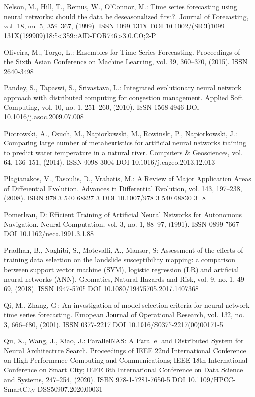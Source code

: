 \begin{thebibliography}{99.}
 Nelson, M., Hill, T., Remus, W., O'Connor, M.: Time series forecasting using neural networks: should the data be deseasonalized first?. Journal of Forecasting, vol. 18, no. 5, 359--367, (1999). ISSN 1099-131X DOI 10.1002/(SICI)1099-131X(199909)18:5<359::AID-FOR746>3.0.CO;2-P

 Oliveira, M., Torgo, L.: Ensembles for Time Series Forecasting. Proceedings of the Sixth Asian Conference on Machine Learning, vol. 39, 360--370, (2015). ISSN 2640-3498

 Pandey, S., Tapaswi, S., Srivastava, L.: Integrated evolutionary neural network approach with distributed computing for congestion management. Applied Soft Computing, vol. 10, no. 1, 251--260, (2010). ISSN 1568-4946 DOI 10.1016/j.asoc.2009.07.008

 Piotrowski, A., Osuch, M., Napiorkowski, M., Rowinski, P., Napiorkowski, J.: Comparing large number of metaheuristics for artificial neural networks training to predict water temperature in a natural river. Computers \& Geosciences, vol. 64, 136--151, (2014). ISSN 0098-3004 DOI 10.1016/j.cageo.2013.12.013

 Plagianakos, V., Tasoulis, D., Vrahatis, M.: A Review of Major Application Areas of Differential Evolution. Advances in Differential Evolution, vol. 143, 197--238, (2008). ISBN 978-3-540-68827-3 DOI 10.1007/978-3-540-68830-3\_8

 Pomerleau, D: Efficient Training of Artificial Neural Networks for Autonomous Navigation. Neural Computation, vol. 3, no. 1, 88--97, (1991). ISSN 0899-7667 DOI 10.1162/neco.1991.3.1.88

 Pradhan, B., Naghibi, S., Motevalli, A., Mansor, S: Assessment of the effects of training data selection on the landslide susceptibility mapping: a comparison between support vector machine (SVM), logistic regression (LR) and artificial neural networks (ANN). Geomatics, Natural Hazards and Risk, vol. 9, no. 1, 49--69, (2018). ISSN 1947-5705 DOI 10.1080/19475705.2017.1407368

 Qi, M., Zhang, G.: An investigation of model selection criteria for neural network time series forecasting. European Journal of Operational Research, vol. 132, no. 3, 666--680, (2001). ISSN 0377-2217 DOI 10.1016/S0377-2217(00)00171-5

 Qu, X., Wang, J., Xiao, J.: ParallelNAS: A Parallel and Distributed System for Neural Architecture Search. Proceedings of IEEE 22nd International Conference on High Performance Computing and Communications; IEEE 18th International Conference on Smart City; IEEE 6th International Conference on Data Science and Systems, 247--254, (2020). ISBN 978-1-7281-7650-5 DOI 10.1109/HPCC-SmartCity-DSS50907.2020.00031


\end{thebibliography}
